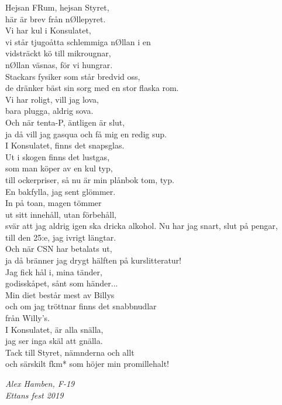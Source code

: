 \documentclass[a6paper,10pt]{article}
\begin{document}
\begin{center}
\end{center}
\small Hejsan FRum, hejsan Styret,\\
här är brev från nØllepyret.\\
Vi har kul i Konsulatet,\\
vi står tjugoåtta schlemmiga nØllan i en
\vspace{5pt}\\
vidsträckt kö till mikrougnar,\\
nØllan väsnas, för vi hungrar.\\
Stackars fysiker som står bredvid oss,\\
de dränker bäst sin sorg med en stor flaska rom.
\vspace{5pt}\\
Vi har roligt, vill jag lova,\\
bara plugga, aldrig sova.\\
Och när tenta-P, äntligen är slut,\\
ja då vill jag gasqua och få mig en redig sup.
\vspace{5pt}\\
I Konsulatet, finns det snapsglas.\\
Ut i skogen finns det lustgas,\\
som man köper av en kul typ,\\
till ockerpriser, så nu är min plånbok tom, typ.
\vspace{5pt}\\
En bakfylla, jag sent glömmer.\\
In på toan, magen tömmer\\
ut sitt innehåll, utan förbehåll,\\
svär att jag aldrig igen ska dricka alkohol.
\setlength{\oddsidemargin}{-0.47in}
\noindent
Nu har jag snart, slut på pengar,\\
till den 25:e, jag ivrigt längtar.\\
Och när CSN har betalats ut,\\
ja då bränner jag drygt hälften på kurslitteratur!
\vspace{5pt}\\
Jag fick hål i, mina tänder,\\
godisskåpet, sånt som händer...\\
Min diet består mest av Billys\\
och om jag tröttnar finns det snabbnudlar \\ från Willy’s.
\vspace{5pt}\\
I Konsulatet, är alla snälla,\\
jag ser inga skäl att gnälla.\\
Tack till Styret, nämnderna och allt\\
och särskilt fkm* som höjer min promillehalt!
\begin{flushright}
\textit{Alex Hamben, F-19 \\Ettans fest 2019}
\end{flushright}
\end{document}

